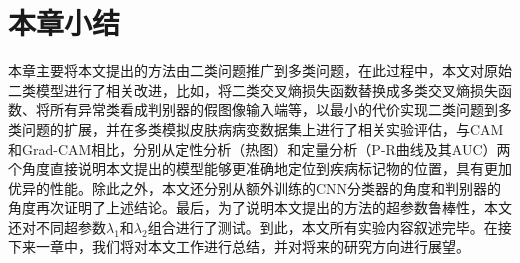\begin{table}[H]
	\centering
	\caption{不同超参数组合下三类异常图像P-R曲线平均AUC分数}
	\label{tab:simulated_skin_diff_parameters}
\end{table}
\section{本章小结}
本章主要将本文提出的方法由二类问题推广到多类问题，在此过程中，本文对原始二类模型进行了相关改进，比如，将二类交叉熵损失函数替换成多类交叉熵损失函数、将所有异常类看成判别器的假图像输入端等，以最小的代价实现二类问题到多类问题的扩展，并在多类模拟皮肤病病变数据集上进行了相关实验评估，与CAM和Grad-CAM相比，分别从定性分析（热图）和定量分析（P-R曲线及其AUC）两个角度直接说明本文提出的模型能够更准确地定位到疾病标记物的位置，具有更加优异的性能。除此之外，本文还分别从额外训练的CNN分类器的角度和判别器的角度再次证明了上述结论。最后，为了说明本文提出的方法的超参数鲁棒性，本文还对不同超参数$\lambda_{1}$和$\lambda_{2}$组合进行了测试。到此，本文所有实验内容叙述完毕。在接下来一章中，我们将对本文工作进行总结，并对将来的研究方向进行展望。


